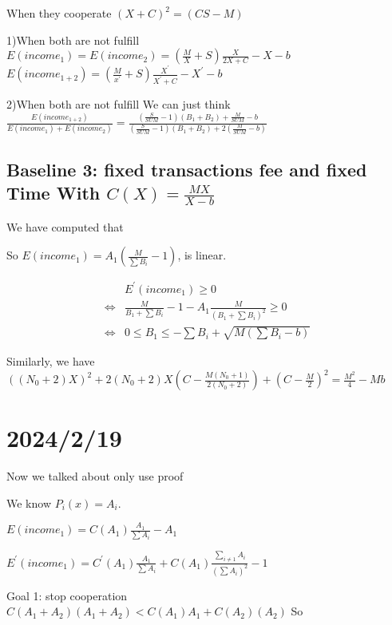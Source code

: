 \documentclass{article}
\begin{document}
 When they cooperate
  $(X+C)^2=(CS-M)$
\par1)When both are not fulfill
$E(income_1)=E(income_2)=(\frac{M}{X}+S)\frac{X}{2X+C}-X-b$
$E(income_{1+2})=(\frac{M}{x^{'}}+S)\frac{X^{'}}{X^{'}+C}-X^{'}-b$
\par2)When both are not fulfill
We can just think $\frac{E(income_{1+2})}{E(income_1)+E(income_2)}=\frac{(\frac{S}{SUM}-1)(B_1+B_2)+\frac{M}{SUM}-b}{(\frac{S}{SUM}-1)(B_1+B_2)+2(\frac{M}{SUM}-b)}$
\subsection{Baseline 3: fixed transactions fee and fixed Time With $C(X)=\frac{MX}{X-b}$}
We have computed that
\par So $E(income_1)=A_1(\frac{M}{\sum B_i}-1)$, is linear.
 \par
 \begin{equation}
\begin{aligned}
&E^{'}(income_1)\ge 0
\\\Longleftrightarrow&\frac{M}{B_1+\sum B_i}-1-A_1\frac{M}{(B_1+\sum B_i)^2}\ge 0
\\\Longleftrightarrow& 0 \le B_1 \le -\sum B_i+\sqrt{M(\sum B_i-b)}
\end{aligned}
\end{equation}
\par Similarly, we have $((N_0+2)X)^2+2(N_0+2)X(C-\frac{M(N_0+1)}{2(N_0+2)})+(C-\frac{M}{2})^2=\frac{M^2}{4}-Mb$



\section{2024/2/19}
Now we talked about only use proof
\par We know $P_i(x)=A_i$.
\par $E(income_1)=C(A_1)\frac{A_1}{\sum A_i}-A_1$
\par $E^{'}(income_1)=C^{'}(A_1)\frac{A_1}{\sum A_i}+C(A_1)\frac{\sum_{i\ne1}A_i}{(\sum A_i)^2}-1$
\par Goal 1: stop cooperation
$C(A_1+A_2)(A_1+A_2)<C(A_1)A_1+C(A_2)(A_2)$
So 
\end{document}
